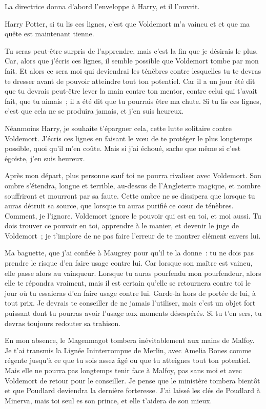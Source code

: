 La directrice donna d'abord l'enveloppe à Harry, et il l'ouvrit.

\later
\begin{writtenNote}
Harry Potter, si tu lis ces lignes, c'est que Voldemort m'a vaincu et et que ma quête est maintenant tienne.

Tu seras peut-être surpris de l'apprendre, mais c'est la fin que je désirais le plus. Car, alors que j'écris ces lignes, il semble possible que Voldemort tombe par mon fait. Et alors ce sera moi qui deviendrai les ténèbres contre lesquelles tu te devras te dresser avant de pouvoir atteindre tout ton potentiel. Car il a un jour été dit que tu devrais peut-être lever la main contre ton mentor, contre celui qui t'avait fait, que tu aimais~; il a été dit que tu pourrais être ma chute. Si tu lis ces lignes, c'est que cela ne se produira jamais, et j'en suis heureux.

Néanmoins Harry, je souhaite t'épargner cela, cette lutte solitaire contre Voldemort. J'écris ces lignes en faisant le vœu de te protéger le plus longtemps possible, quoi qu'il m'en coûte. Mais si j'ai échoué, sache que même si c'est égoïste, j'en suis heureux.

Après mon départ, plus personne sauf toi ne pourra rivaliser avec Voldemort. Son ombre s'étendra, longue et terrible, au-dessus de l'Angleterre magique, et nombre souffriront et mourront par sa faute. Cette ombre ne se dissipera que lorsque tu auras détruit sa source, que lorsque tu auras purifié ce cœur de ténèbres. Comment, je l'ignore. Voldemort ignore le pouvoir qui est en toi, et moi aussi. Tu dois trouver ce pouvoir en toi, apprendre à le manier, et devenir le juge de Voldemort~; je t'implore de ne pas faire l'erreur de te montrer clément envers lui.

Ma baguette, que j'ai confiée à Maugrey pour qu'il te la donne~: tu ne dois pas prendre le risque d'en faire usage contre lui. Car lorsque son maître est vaincu, elle passe alors au vainqueur. Lorsque tu auras pourfendu mon pourfendeur, alors elle te répondra vraiment, mais il est certain qu'elle se retournera contre toi le jour où tu essaieras d'en faire usage contre lui. Garde-la hors de portée de lui, à tout prix. Je devrais te conseiller de ne jamais l'utiliser, mais c'est un objet fort puissant dont tu pourras avoir l'usage aux moments désespérés. Si tu t'en sers, tu devras toujours redouter sa trahison.

En mon absence, le Magenmagot tombera inévitablement aux mains de Malfoy. Je t'ai transmis la Lignée Ininterrompue de Merlin, avec Amelia Bones comme régente jusqu'à ce que tu sois assez âgé ou que tu atteignes tout ton potentiel. Mais elle ne pourra pas longtemps tenir face à Malfoy, pas sans moi et avec Voldemort de retour pour le conseiller. Je pense que le ministère tombera bientôt et que Poudlard deviendra la dernière forteresse. J'ai laissé les clés de Poudlard à Minerva, mais toi seul es son prince, et elle t'aidera de son mieux.


\end{writtenNote}
